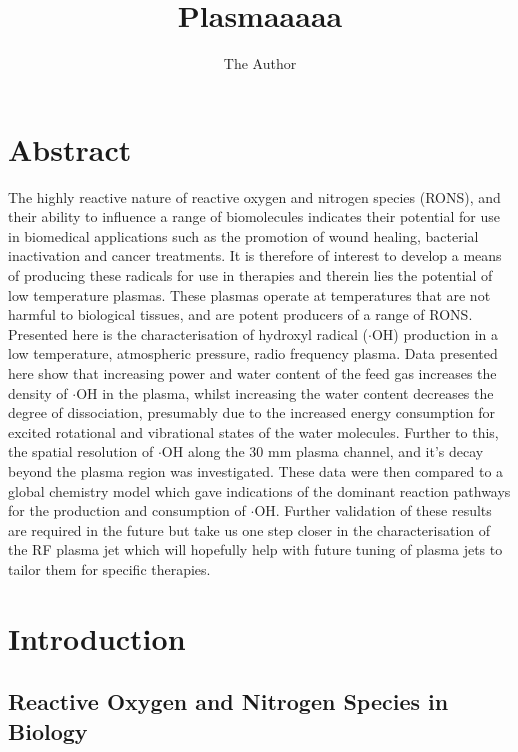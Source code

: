 \documentclass[11pt, oneside]{article}   	%
\title{Plasmaaaaa}
\author{The Author}
\begin{document}
\maketitle

\section{Abstract}

The highly reactive nature of reactive oxygen and nitrogen species (RONS), and their ability to influence a range of biomolecules indicates their potential for use in biomedical applications such as the promotion of wound healing, bacterial inactivation and cancer treatments.
It is therefore of interest to develop a means of producing these radicals for use in therapies and therein lies the potential of low temperature plasmas.
These plasmas operate at temperatures that are not harmful to biological tissues, and are potent producers of a range of RONS.
Presented here is the characterisation of hydroxyl radical ($\cdot$OH) production in a low temperature, atmospheric pressure, radio frequency plasma.
Data presented here show that increasing power and water content of the feed gas increases the density of $\cdot$OH in the plasma, whilst increasing the water content decreases the degree of dissociation, presumably due to the increased energy consumption for excited rotational and vibrational states of the water molecules.
Further to this, the spatial resolution of $\cdot$OH along the 30 mm plasma channel, and it's decay beyond the plasma region was investigated. These data were then compared to a global chemistry model which gave indications of the dominant reaction pathways for the production and consumption of $\cdot$OH.
Further validation of these results are required in the future but take us one step closer in the characterisation of the RF plasma jet which will hopefully help with future tuning of plasma jets to tailor them for specific therapies.

\section{Introduction}

\subsection{Reactive Oxygen and Nitrogen Species in Biology} \label{sec:RONSinBiology}
\end{document}
